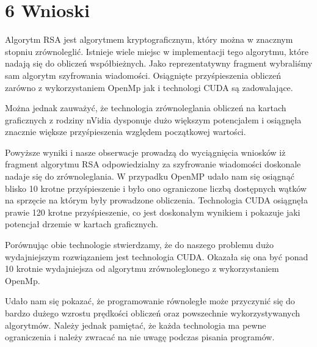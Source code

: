 \documentclass[a4paper,12pt]{article}
\begin{document}
\clearpage
\section*{6 Wnioski}
Algorytm RSA jest algorytmem kryptograficznym, który można w znacznym stopniu zrównoleglić. Istnieje wiele miejsc w implementacji tego algorytmu, które nadają się do obliczeń współbieżnych. Jako reprezentatywny fragment wybraliśmy sam algorytm szyfrowania wiadomości. Osiągnięte przyśpieszenia obliczeń zarówno z wykorzystaniem OpenMp jak i technologi CUDA są zadowalające. 

Można jednak zauważyć, że technologia zrównoleglania obliczeń na kartach graficznych z rodziny nVidia dysponuje dużo większym potencjałem i osiągnęła znacznie większe przyśpieszenia względem początkowej wartości. 

Powyższe wyniki i nasze obserwacje prowadzą do wyciągnięcia wniosków iż fragment algorytmu RSA odpowiedzialny za szyfrowanie wiadomości doskonale nadaje się do zrównoleglania. W przypadku OpenMP udało nam się osiągnąć blisko 10 krotne przyśpieszenie i było ono ograniczone liczbą dostępnych wątków na sprzęcie na którym były prowadzone obliczenia. Technologia CUDA osiągnęła prawie 120 krotne przyśpieszenie, co jest doskonałym wynikiem i pokazuje jaki potencjał drzemie w kartach graficznych.

Porównując obie technologie stwierdzamy, że do naszego problemu dużo wydajniejszym rozwiązaniem jest technologia CUDA. Okazała się ona być ponad 10 krotnie wydajniejsza od algorytmu zrównoleglonego z wykorzystaniem OpenMp.

Udało nam się pokazać, że programowanie równoległe może przyczynić się do bardzo dużego wzrostu prędkości obliczeń oraz powszechnie wykorzystywanych algorytmów. Należy jednak pamiętać, że każda technologia ma pewne ograniczenia i należy zwracać na nie uwagę podczas pisania programów.
	
\end{document}
